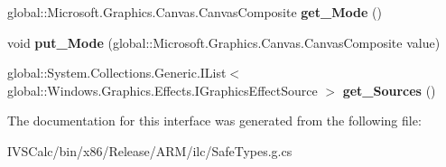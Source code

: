 \begin{DoxyCompactItemize}
\item 
\mbox{\label{interface_microsoft_1_1_graphics_1_1_canvas_1_1_effects_1_1_i_composite_effect_ae3372d28e3699244792f9afa5b3c65da}} 
global\+::\+Microsoft.\+Graphics.\+Canvas.\+Canvas\+Composite {\bfseries get\+\_\+\+Mode} ()
\item 
\mbox{\label{interface_microsoft_1_1_graphics_1_1_canvas_1_1_effects_1_1_i_composite_effect_ae326ed4a8b61faadbb95fe6c97752e31}} 
void {\bfseries put\+\_\+\+Mode} (global\+::\+Microsoft.\+Graphics.\+Canvas.\+Canvas\+Composite value)
\item 
\mbox{\label{interface_microsoft_1_1_graphics_1_1_canvas_1_1_effects_1_1_i_composite_effect_a743a41c08cbc74d9951adf84ceaf101a}} 
global\+::\+System.\+Collections.\+Generic.\+I\+List$<$ global\+::\+Windows.\+Graphics.\+Effects.\+I\+Graphics\+Effect\+Source $>$ {\bfseries get\+\_\+\+Sources} ()
\end{DoxyCompactItemize}


The documentation for this interface was generated from the following file\+:\begin{DoxyCompactItemize}
\item 
I\+V\+S\+Calc/bin/x86/\+Release/\+A\+R\+M/ilc/Safe\+Types.\+g.\+cs\end{DoxyCompactItemize}
